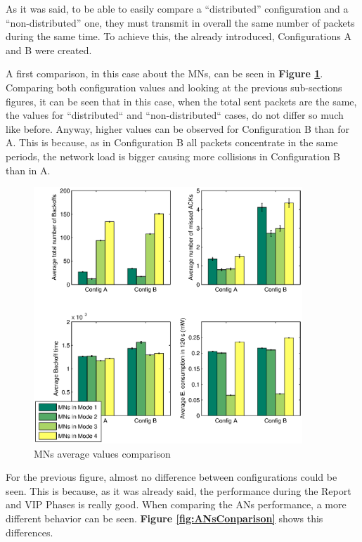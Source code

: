 As it was said, to be able to easily compare a ``distributed'' configuration and a ``non-distributed'' one, they must transmit in overall the same
number of packets during the same time. To achieve this, the already introduced, Configurations A and B were created.

A first comparison, in this case about the \acp{MN}, can be seen in \textbf{Figure \ref{fig:MNsAverageValuesin120s}}. Comparing both
configuration values and looking at the previous sub-sections figures, it can be seen that in this case, when the total sent packets are the 
same, the values for ``distributed`` and ``non-distributed`` cases, do not differ so much like before. Anyway, higher values can be observed 
for Configuration B than for A. This is because, as in Configuration B all packets concentrate in the same periods, the network load is 
bigger causing more collisions in Configuration B than in A.

\begin{figure}[ht]
 \begin{center}
  \includegraphics[width=0.9\textwidth]{MNsAverageValuesin120s.eps}
 \end{center}
 \caption{\acp{MN} average values comparison}
 \label{fig:MNsAverageValuesin120s}
\end{figure}

For the previous figure, almost no difference between configurations could be seen. This is because, as it was already said, the performance
during the Report and \ac{VIP} Phases is really good. When comparing the \acp{AN} performance, a more different behavior can be seen. 
\textbf{Figure \ref{fig:ANsConparison}} shows this differences. 

